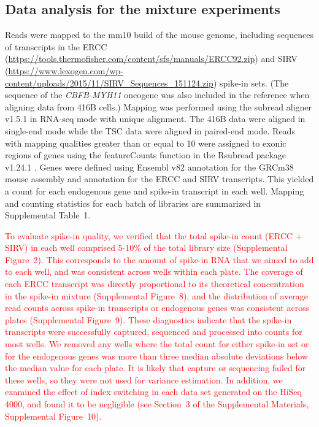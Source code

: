 \documentclass{article}
\newcommand{\suppfigtotals}{2}
\newcommand{\suppfigspikeconc}{8}
\newcommand{\suppfigspikeave}{9}
\newcommand{\suppfigindex}{10}
\newcommand{\suppsecindex}{3}
\newcommand{\supptabstats}{1}
\newcommand{\revised}[1]{\textcolor{red}{#1}}
\begin{document}
\subsection*{Data analysis for the mixture experiments}
Reads were mapped to the mm10 build of the mouse genome, including sequences of transcripts in the ERCC (\url{https://tools.thermofisher.com/content/sfs/manuals/ERCC92.zip}) and SIRV (\url{https://www.lexogen.com/wp-content/uploads/2015/11/SIRV_Sequences_151124.zip}) spike-in sets.
(The sequence of the \textit{CBFB-MYH11} oncogene was also included in the reference when aligning data from 416B cells.)
Mapping was performed using the subread aligner v1.5.1 \autocite{liao2013subread} in RNA-seq mode with unique alignment.
The 416B data were aligned in single-end mode while the TSC data were aligned in paired-end mode.
Reads with mapping qualities greater than or equal to 10 were assigned to exonic regions of genes using the featureCounts function in the Rsubread package v1.24.1 \autocite{liao2014featurecounts}.
Genes were defined using Ensembl v82 annotation for the GRCm38 mouse assembly and annotation for the ERCC and SIRV transcripts.
This yielded a count for each endogenous gene and spike-in transcript in each well.
Mapping and counting statistics for each batch of libraries are summarized in Supplemental Table~\supptabstats{}.

\revised{To evaluate spike-in quality, we verified that the total spike-in count (ERCC + SIRV) in each well comprised 5-10\% of the total library size (Supplemental Figure~\suppfigtotals{}).
This corresponds to the amount of spike-in RNA that we aimed to add to each well, and was consistent across wells within each plate.
The coverage of each ERCC transcript was directly proportional to its theoretical concentration in the spike-in mixture (Supplemental Figure~\suppfigspikeconc{}),
and the distribution of average read counts across spike-in transcripts or endogenous genes was consistent across plates (Supplemental Figure~\suppfigspikeave{}).
These diagnostics indicate that the spike-in transcripts were successfully captured, sequenced and processed into counts for most wells.
We removed any wells where the total count for either spike-in set or for the endogenous genes was more than three median absolute deviations below the median value for each plate. 
It is likely that capture or sequencing failed for these wells, so they were not used for variance estimation.
In addition, we examined the effect of index switching \autocite{sinha2017index} in each data set generated on the HiSeq 4000, and found it to be negligible (see Section~\suppsecindex{} of the Supplemental Materials, Supplemental Figure~\suppfigindex{}).}
\end{document}
